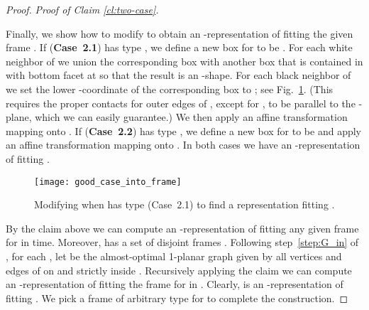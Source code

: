 \documentclass{article}
\newenvironment{claimproof}[1]{\noindent \textit{Proof of Claim #1.}}
{
\hfill \medskip
}
\newcommand{\LL}{\xspace}
\begin{document}
\begin{proof}
\begin{claimproof}{\ref{cl:two-case}}
\begin{description}
     Finally, we show how to modify  to obtain an \LL-representation of  fitting the given frame .
     If (\textbf{Case~2.1})  has type , we define a new box for  to be .
     For each white neighbor of  we union the corresponding box with another box that is contained in  with bottom facet at  so that the result is an \LL-shape.
     For each black neighbor of  we set the lower -coordinate of the corresponding box to ; see Fig.~\ref{fig:good_case_into_frame}.
     (This requires the proper contacts for outer edges of , except for , to be parallel to the -plane, which we can easily guarantee.)
We then apply an affine transformation mapping  onto .
     If (\textbf{Case~2.2})  has type , we define a new box for  to be  and apply an affine transformation mapping  onto .
In both cases we have an \LL-representation of  fitting .
\end{description}\vspace{-0.7cm}
 \end{claimproof}

     \begin{figure}[htb]
      \centering
      \texttt{[image: good\_case\_into\_frame]}
\caption{Modifying  when  has type  (Case~2.1) to
find a representation fitting .}
      \label{fig:good_case_into_frame}
     \end{figure}


By the claim above we can compute an \LL-representation  of  fitting any given
 frame  for  in  time.
Moreover,  has a set of disjoint frames .
Following step~\ref{step:G_in} of {\drawOpt},
for each , let  be the almost-optimal 1-planar graph given by all vertices
 and edges of  on and strictly inside .
Recursively applying the claim we can compute an \LL-representation  of 
 fitting the frame  for  in .
Clearly,  is an \LL-representation
 of  fitting .
We pick a frame  of arbitrary type for  to complete the construction.
\end{proof}



\begin{comment}

\begin{figure}[t]
  \begin{subfigure}[t]{.4\textwidth}
    \centering
    \texttt{[image: cut-box2a]}
    \caption{}
    \label{fig:cut-boxa}
  \end{subfigure}
  \hspace{2em}
  \begin{subfigure}[t]{.4\textwidth}
    \centering
    \texttt{[image: cut-box2b]}
    \caption{}
    \label{fig:cut-boxb}
  \end{subfigure}
    \caption{(a,b) Creating a  open box in a representation of an optimal 1-planar graph.}
\end{figure}

\end{comment}
\end{document}
